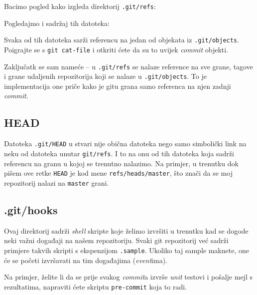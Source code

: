 Bacimo pogled kako izgleda direktorij \verb+.git/refs+:



Pogledajmo i sadržaj tih datoteka:



Svaka od tih datoteka sarži referencu na jedan od objekata iz \verb+.git/objects+. 
Poigrajte se s \verb+git cat-file+ i otkriti ćete da su to uvijek \emph{commit} objekti.

Zaključatk se sam nameće -- u \verb+.git/refs+ se nalaze reference na sve grane, tagove i grane udaljenih repozitorija koji se nalaze u \verb+.git/objects+.
To je implementacija one priče kako je gitu grana samo referenca na njen zadnji \emph{commit}.

\subsection*{HEAD}

Datoteka \verb+.git/HEAD+ u stvari nije obična datoteka nego samo simbolički link na neku od datoteka unutar \verb+git/refs+.
I to na onu od tih datoteka koja sadrži referencu na granu u kojoj se trenutno nalazimo.
Na primjer, u trenutku dok pišem ove retke \verb+HEAD+ je kod mene \verb+refs/heads/master+, što znači da se moj repozitorij nalazi na \verb+master+ grani.

\subsection*{.git/hooks}

Ovaj direktorij sadrži \emph{shell} skripte koje želimo izvršiti u trenutku kad se dogode neki važni događaji na našem repozitoriju.
Svaki git repozitorij već sadrži primjere takvih skripti s ekspenzijom \verb+.sample+.
Ukoliko taj sample maknete, one će se početi izvršavati na tim događajima (\emph{event}ima).

Na primjer, želite li da se prije svakog \emph{commit}a izvrše \emph{unit} testovi i pošalje mejl s rezultatima, napraviti ćete skriptu \verb+pre-commit+ koja to radi.


